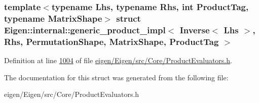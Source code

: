 \subsubsection*{template$<$typename Lhs, typename Rhs, int Product\+Tag, typename Matrix\+Shape$>$\newline
struct Eigen\+::internal\+::generic\+\_\+product\+\_\+impl$<$ Inverse$<$ Lhs $>$, Rhs, Permutation\+Shape, Matrix\+Shape, Product\+Tag $>$}



Definition at line \hyperlink{eigen_2_eigen_2src_2_core_2_product_evaluators_8h_source_l01004}{1004} of file \hyperlink{eigen_2_eigen_2src_2_core_2_product_evaluators_8h_source}{eigen/\+Eigen/src/\+Core/\+Product\+Evaluators.\+h}.



The documentation for this struct was generated from the following file\+:\begin{DoxyCompactItemize}
\item 
eigen/\+Eigen/src/\+Core/\+Product\+Evaluators.\+h\end{DoxyCompactItemize}
